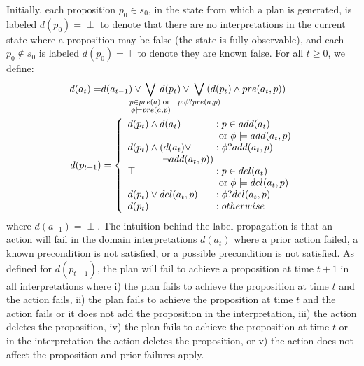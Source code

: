 \documentclass{article}
\begin{document}
Initially, each proposition $p_0 \in s_0$, in the state from which a plan is
generated, is labeled $d(p_0) = \perp$ to denote that there are no
interpretations in the current state where a proposition may be false (the state is fully-observable), and each $p_0 \not\in
s_0$ is labeled $d(p_0)=\top$ to denote they are known false.
For all $t \geq 0$, we define:
 \begin{align}
\notag d({a}_t) =&  
d(a_{t-1}) \vee\hspace*{-.5cm} \bigvee\limits_{\substack{p \in pre(a)
\;\text{or}\;\\\phi \models pre(a, p)}}\hspace*{-.5cm} d(p_t) \vee
\hspace*{-.5cm}\bigvee\limits_{\substack{p : \phi?pre(a, p)}}
\hspace*{-.5cm}(d(p_t)\wedge pre({a}_t, p)  ) \notag %
\\
\notag\hspace*{-.1cm}d(p_{t+1}) &= \left\{
\begin{array}{l@{\;}l@{\;}r}
d(p_t) \wedge d({a}_t) & : p \in add({a}_t) \\ 
 & \;\text{or}\; \phi \models add({a}_t, p)\\
d(p_t) \wedge (d({a}_t) \vee & : \phi?add({a}_t,p)\\
 \hspace*{1.25cm} \neg add({a}_t, p)) \\  
\top & : p \in del({a}_t)\\
 & \;\text{or}\; \phi \models del({a}_t,p)\\
d(p_t) \vee  del({a}_t, p)  &: \phi?del({a}_t, p)\\
d(p_t) & : {otherwise} 
\end{array}
\right. 
\end{align}
\noindent where $d({a}_{-1}) = \perp$. The intuition behind the label
propagation is that an action will fail  in the
domain interpretations $d({a}_t)$ where a prior action failed, a known
precondition is not satisfied, or a possible precondition is not satisfied. As defined for
$d(p_{t+1})$, the plan will fail to achieve a proposition at time $t+1$ in all
interpretations where i) the plan fails to achieve the proposition at time $t$ and the action fails, ii) the plan fails to achieve the proposition at
time $t$ and the action fails or it does not add the proposition in the
interpretation, iii) the action deletes the proposition, iv) the plan fails to
achieve the proposition at time $t$ or in the interpretation the action deletes
the proposition, or v) the action does not affect the proposition and  prior
failures  apply.             
\end{document}
